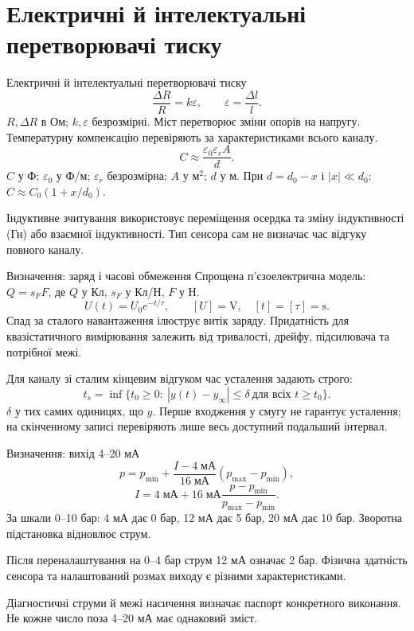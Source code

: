 \documentclass[aspectratio=169,11pt]{beamer}
\begin{document}
\section{Електричні й інтелектуальні перетворювачі тиску}
\begin{frame}{Електричні й інтелектуальні перетворювачі тиску}
\[
 \frac{\Delta R}{R}=k\varepsilon,\qquad \varepsilon=\frac{\Delta l}{l}.
\]
$R,\Delta R$ в Ом; $k,\varepsilon$ безрозмірні. Міст перетворює зміни опорів на напругу. Температурну компенсацію перевіряють за характеристиками всього каналу.
\[
 C\approx\frac{\varepsilon_0\varepsilon_r A}{d}.
\]
$C$ у Ф; $\varepsilon_0$ у Ф/м; $\varepsilon_r$ безрозмірна; $A$ у м$^2$; $d$ у м. При $d=d_0-x$ і $|x|\ll d_0$: $C\approx C_0(1+x/d_0)$.

Індуктивне зчитування використовує переміщення осердка та зміну індуктивності (Гн) або взаємної індуктивності. Тип сенсора сам не визначає час відгуку повного каналу.
\end{frame}
\begin{frame}{Визначення: заряд і часові обмеження}
Спрощена п'єзоелектрична модель: $Q=s_FF$, де $Q$ у Кл, $s_F$ у Кл/Н, $F$ у Н.
\[
 U(t)=U_0 e^{-t/\tau},\qquad [U]=\mathrm{V},\quad [t]=[\tau]=\mathrm{s}.
\]
Спад за сталого навантаження ілюструє витік заряду. Придатність для квазістатичного вимірювання залежить від тривалості, дрейфу, підсилювача та потрібної межі.

Для каналу зі сталим кінцевим відгуком час усталення задають строго:
\[
 t_s=\inf\{t_0\ge0:\ |y(t)-y_\infty|\le\delta\ \text{для всіх }t\ge t_0\}.
\]
$\delta$ у тих самих одиницях, що $y$. Перше входження у смугу не гарантує усталення; на скінченному записі перевіряють лише весь доступний подальший інтервал.
\end{frame}
\begin{frame}{Визначення: вихід 4--20 мА}
\[
 p=p_{\min}+\frac{I-4\;\mathrm{мА}}{16\;\mathrm{мА}}(p_{\max}-p_{\min}),
\]
\[
 I=4\;\mathrm{мА}+16\;\mathrm{мА}\frac{p-p_{\min}}{p_{\max}-p_{\min}}.
\]
За шкали 0--10 бар: 4 мА дає 0 бар, 12 мА дає 5 бар, 20 мА дає 10 бар. Зворотна підстановка відновлює струм.

Після переналаштування на 0--4 бар струм 12 мА означає 2 бар. Фізична здатність сенсора та налаштований розмах виходу є різними характеристиками.

Діагностичні струми й межі насичення визначає паспорт конкретного виконання. Не кожне число поза 4--20 мА має однаковий зміст.
\end{frame}
\end{document}
